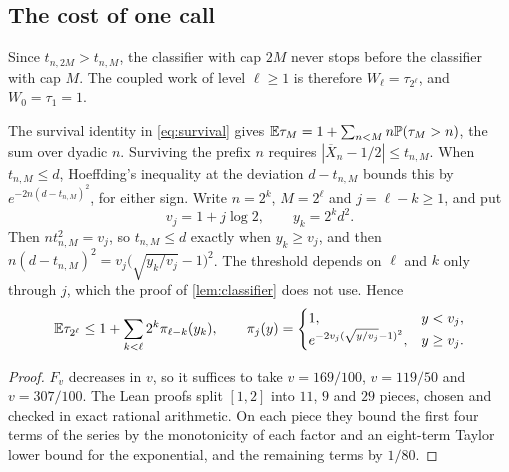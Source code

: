\subsection{The cost of one call}

Since $t_{n,2M}>t_{n,M}$, the classifier with cap $2M$ never stops
before the classifier with cap $M$. The coupled work of level $\ell\ge1$
is therefore $W_\ell=\tau_{2^\ell}$, and $W_0=\tau_1=1$.

The survival identity in \eqref{eq:survival} gives
$\mathbb E\tau_M=1+\sum_{n<M}n\mathbb P(\tau_M>n)$, the sum over dyadic $n$.
Surviving the prefix $n$ requires $|\overline X_n-1/2|\le t_{n,M}$. When
$t_{n,M}\le d$, Hoeffding's inequality at the deviation $d-t_{n,M}$
bounds this by $e^{-2n(d-t_{n,M})^2}$, for either sign. Write $n=2^k$,
$M=2^\ell$ and $j=\ell-k\ge1$, and put
\[
 v_j=1+j\log2,\qquad y_k=2^kd^2 .
\]
Then $nt_{n,M}^2=v_j$, so $t_{n,M}\le d$ exactly when $y_k\ge v_j$, and
then $n(d-t_{n,M})^2=v_j\bigl(\sqrt{y_k/v_j}-1\bigr)^2$. The threshold
depends on $\ell$ and $k$ only through $j$, which the proof of
\cref{lem:classifier} does not use. Hence
\begin{equation}\label{eq:upper-12-survival}
 \mathbb E\tau_{2^\ell}\le1+\sum_{k<\ell}2^k\pi_{\ell-k}(y_k),\qquad
 \pi_j(y)=\begin{cases}1,&y<v_j,\\
 e^{-2v_j(\sqrt{y/v_j}-1)^2},&y\ge v_j.\end{cases}
\end{equation}


\begin{proof}
$F_v$ decreases in $v$, so it suffices to take $v=169/100$, $v=119/50$
and $v=307/100$. The Lean proofs split $[1,2]$ into $11$, $9$ and $29$
pieces, chosen and checked in exact rational arithmetic. On each piece
they bound the first four terms of the series by the monotonicity of each
factor and an eight-term Taylor lower bound for the exponential, and the
remaining terms by $1/80$.
\end{proof}

